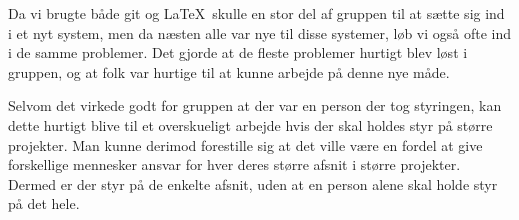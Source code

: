 Da vi brugte både git og \LaTeX\ skulle en stor del af gruppen til at sætte sig ind i et nyt system, men da næsten alle var nye til disse systemer, løb vi også ofte ind i de samme problemer. Det gjorde at de fleste problemer hurtigt blev løst i gruppen, og at folk var hurtige til at kunne arbejde på denne nye måde.

Selvom det virkede godt for gruppen at der var en person der tog styringen, kan dette hurtigt blive til et overskueligt arbejde hvis der skal holdes styr på større projekter. Man kunne derimod forestille sig at det ville være en fordel at give forskellige mennesker ansvar for hver deres større afsnit i større projekter. Dermed er der styr på de enkelte afsnit, uden at en person alene skal holde styr på det hele.
